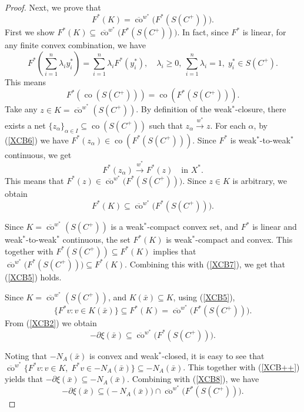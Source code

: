 \documentclass[10pt,a4paper]{amsart}
\begin{document}
\begin{proof}
	Next, we prove that
\begin{equation}\label{XCB5}
	F^*(K) = \overline{\operatorname{co}}^{w^*}\bigl( F^*(S(C^{+})) \bigr).  
 \end{equation}
	First we show $F^*(K) \subseteq \overline{\operatorname{co}}^{w^*}\bigl( F^*(S(C^{+})) \bigr)$.
In fact,	since $F^*$ is linear, for any finite convex combination, we have
	\[
	F^*\left( \sum_{i=1}^n \lambda_i y_i^* \right) = \sum_{i=1}^n \lambda_i F^*(y_i^*), \quad \lambda_i \ge 0,\ \sum_{i=1}^n \lambda_i = 1, \;  y_i^* \in S(C^+).
	\]
	This means
\begin{equation}\label{XCB6}
	F^*(\operatorname{co}(S(C^+))) = \operatorname{co}( F^*(S(C^+)) ).  
 \end{equation}
	Take any $z \in K = \overline{\operatorname{co}}^{w^*}(S(C^+))$. By definition of the weak$^*$-closure, there exists a net $\{z_\alpha\}_{\alpha \in I} \subseteq \operatorname{co}(S(C^+))$ such that $z_\alpha \xrightarrow{w^*} z$.
	For each $\alpha$, by (\ref{XCB6}) we have $F^*(z_\alpha) \in \operatorname{co}(F^*(S(C^+)))$. Since $F^*$ is weak$^*$-to-weak$^*$ continuous, we get 
	\[
	F^*(z_\alpha) \xrightarrow{w^*} F^*(z) \quad \text{in } X^*.
	\]
 This means that
$	F^*(z) \in \overline{\operatorname{co}}^{w^*}\bigl( F^*(S(C^+)) \bigr).$
	Since $z \in K$ is arbitrary, we obtain 
	\begin{equation}\label{XCB7}
	F^*(K) \subseteq \overline{\operatorname{co}}^{w^*}\bigl( F^*(S(C^+)) \bigr).
	 \end{equation}
	 
	Since $K = \overline{\operatorname{co}}^{w^*}(S(C^+))$ is   a   weak$^*$-compact convex set, and $F^*$ is   linear and weak$^*$-to-weak$^*$ continuous, the set $F^*(K)$ is weak$^*$-compact and convex. This together with $F^*(S(C^+)) \subseteq F^*(K)$  implies that
$	\overline{\operatorname{co}}^{w^*} \bigl( F^*(S(C^+)) \bigr) \subseteq F^*(K).$   Combining this with (\ref{XCB7}), we get that (\ref{XCB5})  holds.
	
 
	Since $K = \overline{\operatorname{co}}^{w^*}(S(C^{+}))$, and $K(\bar{x}) \subseteq K$, using (\ref{XCB5}),
	\[
	\{ F^*v : v \in K(\bar{x}) \} \subseteq F^*(K) = \overline{\operatorname{co}}^{w^*}\bigl( F^*(S(C^{+})) \bigr).
	\]
	From (\ref{XCB2}) we obtain
		\begin{equation}\label{XCB8}
	- \partial \xi(\bar{x}) \subseteq \overline{\operatorname{co}}^{w^*} \bigl( F^*(S(C^{+})) \bigr).  
	 \end{equation}
	
Noting that   $-N_A(\bar{x})$ is convex and weak$^*$-closed, 	it is easy to see that $ \overline{\operatorname{co}}^{w^*} \bigl\{ F^*v : v \in K,\; F^*v \in -N_A(\bar{x}) \bigr\}    \subseteq -N_A(\bar{x})$. 	This together with  (\ref{XCB++})  yields that   $-\partial \xi(\bar{x}) \subseteq -N_A(\bar{x})$.
		Combining with (\ref{XCB8}), we have
	\[
	- \partial \xi(\bar{x}) \subseteq \bigl( -N_A(\bar{x}) \bigr) \cap \overline{\operatorname{co}}^{w^*} \bigl( F^*(S(C^{+})) \bigr).
	\]
	

\end{proof}
\end{document}

